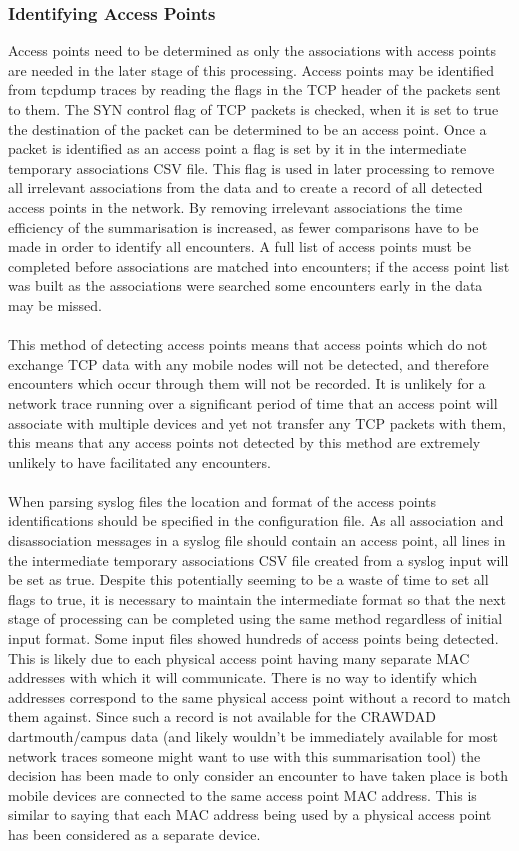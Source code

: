 \subsubsection{Identifying Access Points}
Access points need to be determined as only the associations with access points are needed in the later stage of this processing. Access points may be identified from tcpdump traces by reading the flags in the TCP header of the packets sent to them. The SYN control flag of TCP packets is checked, when it is set to true the destination of the packet can be determined to be an access point. Once a packet is identified as an access point a flag is set by it in the intermediate temporary associations CSV file. This flag is used in later processing to remove all irrelevant associations from the data and to create a record of all detected access points in the network. By removing irrelevant associations the time efficiency of the summarisation is increased, as fewer comparisons have to be made in order to identify all encounters. A full list of access points must be completed before associations are matched into encounters; if the access point list was built as the associations were searched some encounters early in the data may be missed.\\\\
This method of detecting access points means that access points which do not exchange TCP data with any mobile nodes will not be detected, and therefore encounters which occur through them will not be recorded. It is unlikely for a network trace running over a significant period of time that an access point will associate with multiple devices and yet not transfer any TCP packets with them, this means that any access points not detected by this method are extremely unlikely to have facilitated any encounters.\\\\
When parsing syslog files the location and format of the access points identifications should be specified in the configuration file. As all association and disassociation messages in a syslog file should contain an access point, all lines in the intermediate temporary associations CSV file created from a syslog input will be set as true. Despite this potentially seeming to be a waste of time to set all flags to true, it is necessary to maintain the intermediate format so that the next stage of processing can be completed using the same method regardless of initial input format.
Some input files showed hundreds of access points being detected. This is likely due to each physical access point having many separate MAC addresses with which it will communicate. There is no way to identify which addresses correspond to the same physical access point without a record to match them against. Since such a record is not available for the CRAWDAD dartmouth/campus data (and likely wouldn't be immediately available for most network traces someone might want to use with this summarisation tool) the decision has been made to only consider an encounter to have taken place is both mobile devices are connected to the same access point MAC address. This is similar to saying that each MAC address being used by a physical access point has been considered as a separate device.
